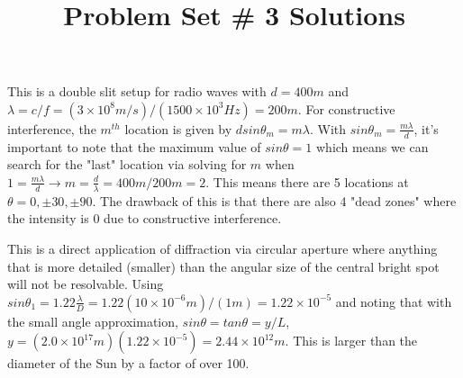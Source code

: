 \documentclass[10pt]{article}
\newenvironment{problem}[2][Problem]{\begin{trivlist}
\item[\hskip \labelsep {\bfseries #1}\hskip \labelsep {\bfseries #2.}]}{\end{trivlist}}
\begin{document}
 \title{Problem Set \# 3 Solutions}
\date{}
\maketitle

\begin{problem}{1}
\item This is a double slit setup for radio waves with $d=400m$ and $\lambda = c/f=(3\times 10^8 m/s)/(1500\times 10^3Hz)=200m$. For constructive interference, the $m^{th}$ location is given by $dsin\theta_m=m\lambda$. With $sin\theta_m=\frac{m\lambda}{d}$, it's important to note that the maximum value of $sin\theta=1$ which means we can search for the "last" location via solving for $m$ when $1 = \frac{m\lambda}{d}\xrightarrow{} m=\frac{d}{\lambda} = 400m/200m=2$. This means there are 5 locations at $\theta=0, \pm30, \pm90$. The drawback of this is that there are also 4 "dead zones" where the intensity is 0 due to constructive interference.
\end{problem}
 
\begin{problem}{2}
This is a direct application of diffraction via circular aperture where anything that is more detailed (smaller) than the angular size of the central bright spot will not be resolvable. Using $sin\theta_1 = 1.22 \frac{\lambda}{D}=1.22 (10\times10^{-6}m)/(1m)=1.22\times10^{-5}$ and noting that with the small angle approximation, $sin\theta=tan\theta=y/L$, $y=(2.0\times10^{17}m)(1.22\times 10^{-5})=2.44\times10^{12}m$. This is larger than the diameter of the Sun by a factor of over 100.
\end{problem}
\end{document}
